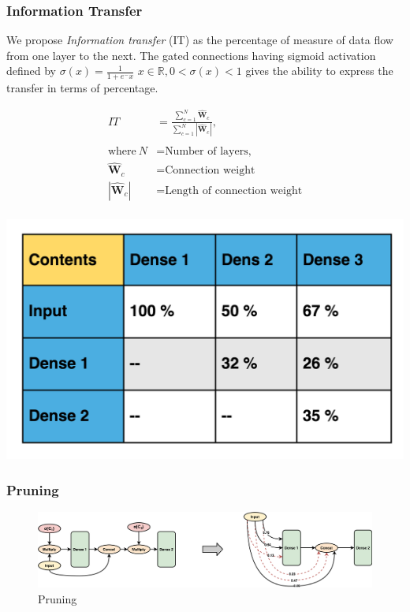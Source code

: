 \documentclass{article}
\let\oldhat\hat
\renewcommand{\hat}[1]{\oldhat{\mathbf{#1}}}
\begin{document}
\subsubsection{Information Transfer}
We propose \emph{Information transfer} (IT) as the percentage of measure of data flow from one layer to the next. The gated connections having sigmoid activation \cite{Han1995TheIO} defined by $\sigma(x) = \frac{1}{1+e^-x}$ $x\in\mathbb{R}, 0<\sigma(x)<1$  gives the ability to express the transfer in terms of percentage. 

\noindent\begin{minipage}{.45\textwidth}
\begin{align*}
  IT &=\frac{\sum_{c=1}^{N}\hat{W}_{c}}{\sum_{c=1}^{N}|\hat{W}_{c}|}, \\
  \\
  \text{where}~N &= \text{Number of layers,} \\
  \hat{W}_{c} &= \text{Connection weight}\\
  |\hat{W}_{c}| &= \text{Length of connection weight}\\
\end{align*}
\end{minipage}
\begin{minipage}{.45\textwidth}
   \centering
   \includegraphics[scale=0.13]{SampleTable.png}
   \label{fig:DSC.png}
\end{minipage}

\subsubsection{Pruning}
\begin{figure}[h!]
\centering
\includegraphics[scale=0.1]{Pruning.png}
\caption{Pruning}
\label{fig:infotransfer}
\end{figure}
\end{document}
